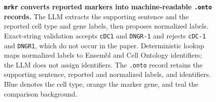 \begin{figure}[t]
\centering
\resizebox{\textwidth}{!}{%
}
\caption{\textbf{\texttt{mrkr} converts reported markers into machine-readable \texttt{.onto} records.} The LLM extracts the supporting sentence and the reported cell type and gene labels, then proposes normalized labels. Exact-string validation accepts \texttt{cDC1} and \texttt{DNGR-1} and rejects \texttt{cDC-1} and \texttt{DNGR1}, which do not occur in the paper. Deterministic lookup maps normalized labels to Ensembl and Cell Ontology identifiers; the LLM does not assign identifiers. The \texttt{.onto} record retains the supporting sentence, reported and normalized labels, and identifiers. Blue denotes the cell type, orange the marker gene, and teal the comparison background.}
  \label{fig:mrkr_overview}%
%
%
%
\end{figure}
